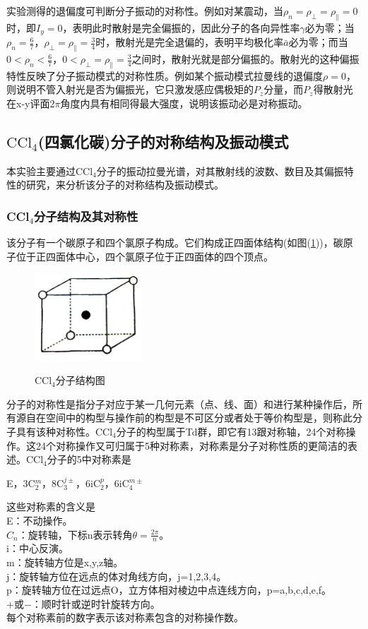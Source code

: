 \documentclass[a4paper]{article}
\begin{document}
实验测得的退偏度可判断分子振动的对称性。例如对某震动，当$\rho_{n} = \rho_{\perp} = \rho_{\parallel} = 0$时，即$I_y = 0$，表明此时散射是完全偏振的，因此分子的各向异性率$\gamma$必为零；当$\rho_n = \frac{6}{7}$，$\rho_{\perp} = \rho_{\parallel} = \frac{3}{4}$时，散射光是完全退偏的，表明平均极化率$\bar{a}$必为零；而当$0<\rho_n<\frac{6}{7}$，$0<\rho_{\perp} = \rho_{\parallel} = \frac{3}{4}$之间时，散射光就是部分偏振的。散射光的这种偏振特性反映了分子振动模式的对称性质。例如某个振动模式拉曼线的退偏度$\rho = 0$，则说明不管入射光是否为偏振光，它只激发感应偶极矩的$P_z$分量，而$P_z$得散射光在x-y评面2$\pi$角度内具有相同得最大强度，说明该振动必是对称振动。
\subsection{$\text{CCl}_4$(四氯化碳)分子的对称结构及振动模式}
本实验主要通过CCl$_4$分子的振动拉曼光谱，对其散射线的波数、数目及其偏振特性的研究，来分析该分子的对称结构及振动模式。
\subsubsection{CCl$_4$分子结构及其对称性}
该分子有一个碳原子和四个氯原子构成。它们构成正四面体结构(如图(\ref{fig3}))，碳原子位于正四面体中心，四个氯原子位于正四面体的四个顶点。
\begin{figure}[!h]
\centering
\includegraphics[width=4cm]{fig/3.png}\\
\caption{CCl$_4$分子结构图}\label{fig3}
\end{figure}
分子的对称性是指分子对应于某一几何元素（点、线、面）和进行某种操作后，所有源自在空间中的构型与操作前的构型是不可区分或者处于等价构型是，则称此分子具有该种对称性。CCl$_4$分子的构型属于Td群，即它有13跟对称轴，24个对称操作。这24个对称操作又可归属于5种对称素，对称素是分子对称性质的更简洁的表述。CCl$_4$分子的5中对称素是

E，3C$^m_2$，8C$^{j\pm}_3$，6iC$^p_2$，6iC$^{m\pm}_{4}$

这些对称素的含义是\\
E：不动操作。\\
$C_n$：旋转轴，下标n表示转角$\theta = \frac{2\pi}{n}$。\\
i：中心反演。\\
m：旋转轴方位是x,y,z轴。\\
j：旋转轴方位在远点的体对角线方向，j=1,2,3,4。\\
p：旋转轴方位在过远点O，立方体相对棱边中点连线方向，p=a,b,c,d,e,f。\\
$+$或$-$：顺时针或逆时针旋转方向。\\
每个对称素前的数字表示该对称素包含的对称操作数。
\end{document}

